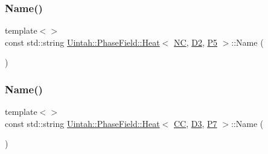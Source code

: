 \mbox{\label{classUintah_1_1PhaseField_1_1Heat_a214c05a905e1fca240598408207c7bf5}} 
\subsubsection{\texorpdfstring{Name()}{Name()}\hspace{0.1cm}{\footnotesize\ttfamily [2/8]}}
{\footnotesize\ttfamily template$<$$>$ \\
const std\+::string \hyperlink{classUintah_1_1PhaseField_1_1Heat}{Uintah\+::\+Phase\+Field\+::\+Heat}$<$ \hyperlink{namespaceUintah_1_1PhaseField_a33d355affda78a83f45755ba8388cedda77924170fe82bfd58b74ca3e44139718}{NC}, \hyperlink{namespaceUintah_1_1PhaseField_a12bfc68444894dffdf0cb8d9cf0cc76aa1a451dae278b0103a94105c8776e9a67}{D2}, \hyperlink{namespaceUintah_1_1PhaseField_a24d833a720598df1020f5cc2e75f8702a218e7fca21085b602c79158a04bc83a0}{P5} $>$\+::Name (\begin{DoxyParamCaption}{ }\end{DoxyParamCaption})}

\mbox{\label{classUintah_1_1PhaseField_1_1Heat_ae1663b72cb7781cb2ed3822403303665}} 
\subsubsection{\texorpdfstring{Name()}{Name()}\hspace{0.1cm}{\footnotesize\ttfamily [3/8]}}
{\footnotesize\ttfamily template$<$$>$ \\
const std\+::string \hyperlink{classUintah_1_1PhaseField_1_1Heat}{Uintah\+::\+Phase\+Field\+::\+Heat}$<$ \hyperlink{namespaceUintah_1_1PhaseField_a33d355affda78a83f45755ba8388cedda22303704507d024d1d6508ed9859a85a}{CC}, \hyperlink{namespaceUintah_1_1PhaseField_a12bfc68444894dffdf0cb8d9cf0cc76aa72fd61934c7ca788c49ad90629f76e78}{D3}, \hyperlink{namespaceUintah_1_1PhaseField_a24d833a720598df1020f5cc2e75f8702a099a5b9a00f5644bb917fdec6afd8768}{P7} $>$\+::Name (\begin{DoxyParamCaption}{ }\end{DoxyParamCaption})}

